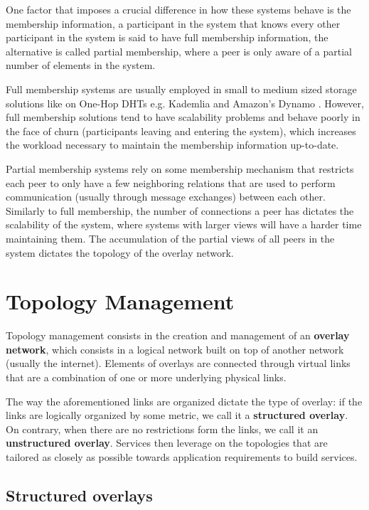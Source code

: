 One factor that imposes a crucial difference in how these systems behave is the membership information, a participant in the system that knows every other participant in the system is said to have full membership information, the alternative is called partial membership, where a peer is only aware of a partial number of elements in the system.

Full membership systems are usually employed in small to medium sized storage solutions like on One-Hop DHTs e.g. Kademlia \cite{10.1007/3-540-45748-8_5} and Amazon's Dynamo \cite{decandia2007dynamo}. However, full membership solutions tend to have scalability problems and behave poorly in the face of churn (participants leaving and entering the system), which increases the workload necessary to maintain the membership information up-to-date. 


Partial membership systems rely on some membership mechanism that restricts each peer to only have a few neighboring relations that are used to perform communication (usually through message exchanges) between each other. Similarly to full membership, the number of connections a peer has  dictates the scalability of the system, where systems with larger views will have a harder time maintaining them. The accumulation of the partial views of all peers in the system dictates the topology of the overlay network.

\section{Topology Management}
\label{sec:topology_mgmt}

Topology management consists in the creation and management of an \textbf{overlay network}, which consists in a logical network built on top of another network (usually the internet). Elements of overlays are connected through virtual links that are a combination of one or more underlying physical links.

The way the aforementioned links are organized dictate the type of overlay: if the links are logically organized by some metric, we call it a \textbf{structured overlay}. On contrary, when there are no restrictions form the links, we call it an \textbf{unstructured overlay}. Services then leverage on the topologies that are tailored as closely as possible towards application requirements to build services.

\subsection{Structured overlays}

